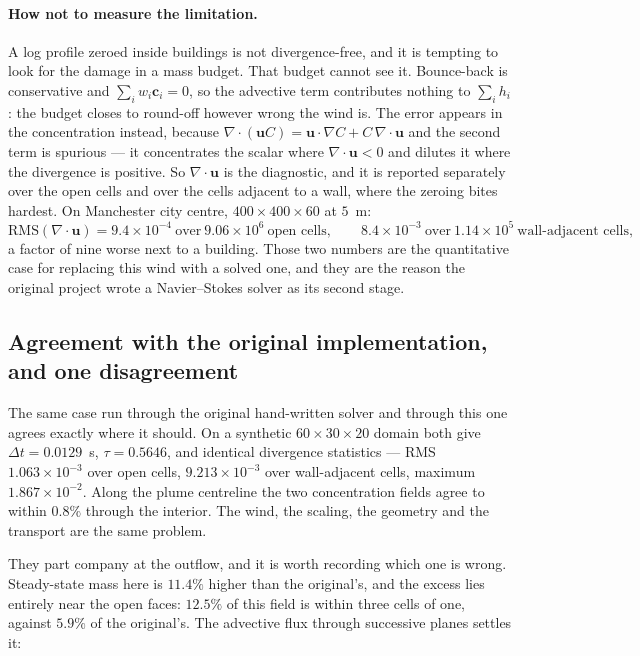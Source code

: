 \documentclass[11pt,a4paper]{article}
\newcommand{\ci}{\bm{c}_i}
\newcommand{\uu}{\bm{u}}
\begin{document}
\paragraph{How not to measure the limitation.} A log profile zeroed inside
buildings is not divergence-free, and it is tempting to look for the damage in a
mass budget. That budget cannot see it. Bounce-back is conservative and
$\sum_i w_i \ci = 0$, so the advective term contributes nothing to
$\sum_i h_i$: the budget closes to round-off however wrong the wind is. The
error appears in the concentration instead, because
$\nabla\!\cdot\!(\uu C) = \uu\!\cdot\!\nabla C + C\,\nabla\!\cdot\!\uu$
and the second term is spurious --- it concentrates the scalar where
$\nabla\!\cdot\!\uu < 0$ and dilutes it where the divergence is positive. So
$\nabla\!\cdot\!\uu$ is the diagnostic, and it is reported separately over
the open cells and over the cells adjacent to a wall, where the zeroing bites
hardest. On Manchester city centre, $400\times400\times60$ at $5$~m:
\[
  \mathrm{RMS}(\nabla\!\cdot\!\uu) = 9.4\times10^{-4}
  \ \text{over}\ 9.06\times10^{6}\ \text{open cells},
  \qquad
  8.4\times10^{-3}\ \text{over}\ 1.14\times10^{5}\ \text{wall-adjacent cells},
\]
a factor of nine worse next to a building. Those two numbers are the
quantitative case for replacing this wind with a solved one, and they are the
reason the original project wrote a Navier--Stokes solver as its second stage.

\subsection{Agreement with the original implementation, and one disagreement}
\label{sec:urbancompare}

The same case run through the original hand-written solver and through this one
agrees exactly where it should. On a synthetic $60\times30\times20$ domain both
give $\Delta t = 0.0129$~s, $\tau = 0.5646$, and identical divergence
statistics --- RMS $1.063\times10^{-3}$ over open cells, $9.213\times10^{-3}$
over wall-adjacent cells, maximum $1.867\times10^{-2}$. Along the plume
centreline the two concentration fields agree to within $0.8\%$ through the
interior. The wind, the scaling, the geometry and the transport are the same
problem.

They part company at the outflow, and it is worth recording which one is wrong.
Steady-state mass here is $11.4\%$ higher than the original's, and the excess
lies entirely near the open faces: $12.5\%$ of this field is within three cells
of one, against $5.9\%$ of the original's. The advective flux through successive
planes settles it:
\end{document}
